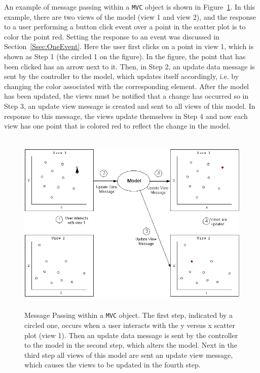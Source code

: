 \documentclass[11pt]{article}
\newcommand{\Robject}[1]{{\texttt{#1}}}
\begin{document}
An example of message passing within a \Robject{MVC} object is shown
in Figure~\ref{Fig:MPwithin}.  In this example, there are two views of the
model (view 1 and view 2), and the response to a user
performing a button click event over a point in the scatter plot is to
color the point red.  Setting the response to an event was discussed
in Section~\ref{Ssec:OneEvent}.  Here the user first clicks on a point
in view 1, which is shown as Step 1 (the circled 1 on the
figure).  In the figure, the point that has been clicked has an arrow
next to it.  Then, in Step 2, an update data message is sent by the 
controller to the
model, which updates itself accordingly, i.e. by changing the color
associated with the corresponding element.  After the model has been
updated, the views must be notified that a change has occurred so in
Step 3, an update view message is created and sent to all views of
this model.  In response to this message, the views update themselves in
Step 4 and now each view has one point that is colored red to reflect the
change in the model.

\begin{figure}[ht]
  \begin{center}
    \includegraphics[height=3.5in, width=5in]{newMPwithin2.jpg}
    \caption{ Message Passing within a \Robject{MVC} object.  The first step,
      indicated by a circled one, occurs when a user interacts with the y
      versus x scatter plot (view 1).  Then an update data message is sent by
      the controller to
      the model in the second step, which alters the model.  Next in the third
      step all views of this model are sent an update view message, which
      causes the views to be updated in the fourth step. }
    \label{Fig:MPwithin}
  \end{center}
\end{figure}
\end{document}
